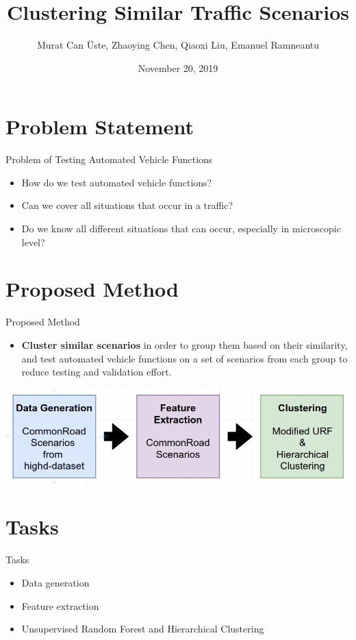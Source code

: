 \documentclass[shortpres]{beamer}
\title[Motion Planning for Autonomous Vehicles]{Clustering Similar Traffic Scenarios}
\author[\"Uste, Chen, Liu, Ramneantu]{Murat Can \"Uste, Zhaoying Chen, Qiaoxi Liu, Emanuel Ramneantu}
\institute[TU M\"unchen]{Technische Universit\"at M\"unchen}
\date{November 20, 2019}
\begin{document}
\begin{frame}
    \titlepage
\end{frame}

\section{Problem Statement}	

\begin{frame}{Problem of Testing Automated Vehicle Functions}	

\begin{itemize} 
\item How do we test automated vehicle functions?
\vfill \item  Can we cover all situations that occur in a traffic?
\vfill \item  Do we know all different situations that can occur, especially in microscopic level?
\end{itemize}
\end{frame}

\section{Proposed Method}	

\begin{frame}{Proposed Method}	

\begin{itemize} 
\item \textbf{Cluster similar scenarios} in order to group them based on their similarity, and test automated vehicle functions on a set of scenarios from each group to reduce testing and validation effort.
\end{itemize}

\includegraphics[width=\textwidth]{proposed_01}
\end{frame}

\section{Tasks}	

\begin{frame}{Tasks}	

\begin{itemize} 
\item Data generation
\vfill \item Feature extraction
\vfill \item Unsupervised Random Forest and Hierarchical Clustering
\end{itemize}
\end{frame}
\end{document}

